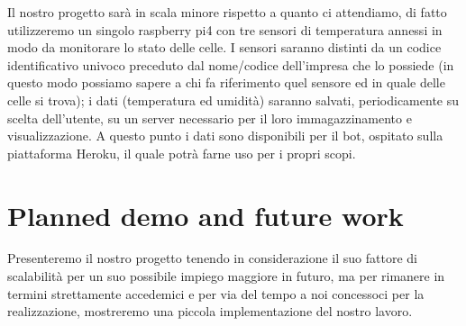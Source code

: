 Il nostro progetto sarà in scala minore rispetto a quanto ci attendiamo, di fatto utilizzeremo un singolo raspberry pi4 con tre sensori di temperatura annessi in modo da monitorare lo stato delle celle. I sensori saranno distinti da un codice identificativo univoco preceduto dal nome/codice dell'impresa che lo possiede (in questo modo possiamo sapere a chi fa riferimento quel sensore ed in quale delle celle si trova); i dati (temperatura ed umidità) saranno salvati, periodicamente su scelta dell'utente, su un server necessario per il loro immagazzinamento e visualizzazione. A questo punto i dati sono disponibili per il bot, ospitato sulla piattaforma Heroku, il quale potrà farne uso per i propri scopi.




\section{Planned demo and future work}
Presenteremo il nostro progetto tenendo in considerazione il suo fattore di scalabilità per un suo possibile impiego maggiore in futuro, ma per rimanere in termini strettamente accedemici e per via del tempo a noi concessoci per la realizzazione, mostreremo una piccola implementazione del nostro lavoro.
\vspace{3mm}

